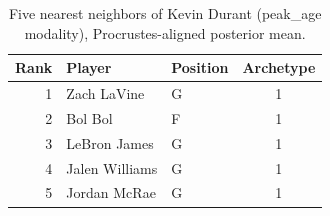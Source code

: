 \begin{table}[htbp]
  \centering\small
  \begin{tabular}{rllc}
    \toprule
    Rank & Player & Position & Archetype \\
    \midrule
    1 & Zach LaVine & G & 1 \\
    2 & Bol Bol & F & 1 \\
    3 & LeBron James & G & 1 \\
    4 & Jalen Williams & G & 1 \\
    5 & Jordan McRae & G & 1 \\
    \bottomrule
  \end{tabular}
  \caption{Five nearest neighbors of Kevin Durant (peak_age modality), Procrustes-aligned posterior mean.}
  \label{tab:Kevin_Durant_neighbors_peak_age}
\end{table}

